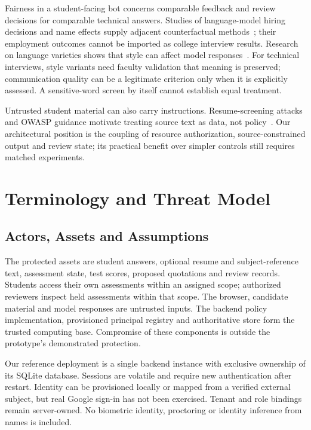 \documentclass[conference]{IEEEtran}
\begin{document}
Fairness in a student-facing bot concerns comparable feedback and review decisions for comparable technical answers. Studies of language-model hiring decisions and name effects supply adjacent counterfactual methods~\cite{an2024discriminate,nghiem2024name}; their employment outcomes cannot be imported as college interview results. Research on language varieties shows that style can affect model responses~\cite{fleisig2024linguistic}. For technical interviews, style variants need faculty validation that meaning is preserved; communication quality can be a legitimate criterion only when it is explicitly assessed. A sensitive-word screen by itself cannot establish equal treatment.

Untrusted student material can also carry instructions. Resume-screening attacks and OWASP guidance motivate treating source text as data, not policy~\cite{baxi2026prompt,owasp2025llm}. Our architectural position is the coupling of resource authorization, source-constrained output and review state; its practical benefit over simpler controls still requires matched experiments.

\section{Terminology and Threat Model}
\subsection{Actors, Assets and Assumptions}
The protected assets are student answers, optional resume and subject-reference text, assessment state, test scores, proposed quotations and review records. Students access their own assessments within an assigned scope; authorized reviewers inspect held assessments within that scope. The browser, candidate material and model responses are untrusted inputs. The backend policy implementation, provisioned principal registry and authoritative store form the trusted computing base. Compromise of these components is outside the prototype's demonstrated protection.

Our reference deployment is a single backend instance with exclusive ownership of its SQLite database. Sessions are volatile and require new authentication after restart. Identity can be provisioned locally or mapped from a verified external subject, but real Google sign-in has not been exercised. Tenant and role bindings remain server-owned. No biometric identity, proctoring or identity inference from names is included.
\end{document}
